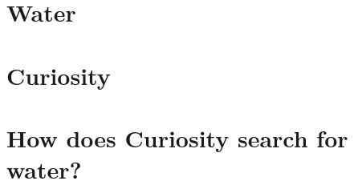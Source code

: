 \documentclass[DIV=calc, paper=a4, fontsize=12pt]{scrartcl}	 %
\begin{document}

\section{Water}

\begin{multicols}{2}



\end{multicols}

{






%




\section{Curiosity}



\section{How does Curiosity search for water?}

\begin{multicols}{2}






\end{multicols}}
\end{document}

